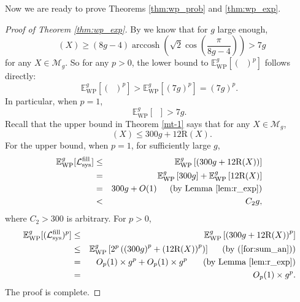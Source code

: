 \documentclass[UTF8]{amsart}
\numberwithin{equation}{section}
\theoremstyle{definition}
\theoremstyle{example}
\theoremstyle{remark}
\DeclareMathOperator{\arccosh}{arccosh}
\DeclareMathOperator{\slfs}{\mathcal{L}_{sys}^{fill}}
\newcommand{\sM}{\mathcal{M}}
\begin{document}
Now we are ready to prove Theorems \ref{thm:wp_prob} and \ref{thm:wp_exp}.

\begin{proof}[Proof of Theorem \ref{thm:wp_exp}]
By \cite[Theorem 1.1]{gao2025shortest} we know that for $g$ large enough, 
\begin{equation}\label{lb-7g}
\slfs(X)\geq (8g-4)\arccosh\left(\sqrt{2}\cos\left(\frac{\pi}{8g-4}\right)\right)>7g   
\end{equation}
for any $X\in \sM_g$. So for any $p>0$, the lower bound to $ \mathbb{E}_{\mathrm{WP}}^g[(\slfs)^p]$ follows directly:
\[
\mathbb{E}_{\mathrm{WP}}^g[(\slfs)^p] > \mathbb{E}_{\mathrm{WP}}^g \left[ \left(7g  \right)^p  \right] = \left(7g  \right)^p. 
\]
In particular, when $p=1$, 
\[
\mathbb{E}_{\mathrm{WP}}^g[\slfs] > 7g. 
\]
Recall that the upper bound in Theorem \ref{mt-1} says that for any $X \in \mathcal{M}_g$, 
	\[
		 \slfs(X) \le 300g+12\mathrm{R}(X).
	\]
\noindent  For the upper bound, when $p=1$, for sufficiently large $g$,
\begin{eqnarray*}
	\mathbb{E}_{\mathrm{WP}}^g[\slfs] &\le& \mathbb{E}_{\mathrm{WP}}^g \left[ \left(300g + 12\mathrm{R}(X)  \right)  \right]  \\
					      &=& \mathbb{E}_{\mathrm{WP}}^g \left[ 300g \right] + \mathbb{E}_{\mathrm{WP}}^g \left[12\mathrm{R}(X)    \right] \\
					      &=& 300g + O(1) \text{\,\,\,\quad (by Lemma \ref{lem:r_exp})} \\
					      &<& C_2g,
\end{eqnarray*}
where $C_2>300$ is arbitrary. For $p>0$, 
\begin{eqnarray*}
	\mathbb{E}_{\mathrm{WP}}^g[(\slfs)^p] &\le& \mathbb{E}_{\mathrm{WP}}^g \left[ \left(300g + 12\mathrm{R}(X)  \right)^p  \right]  \\
					      & \le & \mathbb{E}_{\mathrm{WP}}^g \left[ 2^p \left( \left(300g\right)^p + \left(12\mathrm{R}(X)  \right)^p \right)   \right] \text{\,\,\,\quad (by (\ref{for:sum_an}))} \\
					      &=& O_p(1)\times g^p + O_p(1)\times g^p \text{\,\,\,\quad \  (by Lemma \ref{lem:r_exp})} \\
					      &=& O_p(1)\times g^p. 
\end{eqnarray*}
The proof is complete. 
\end{proof}
\end{document}
